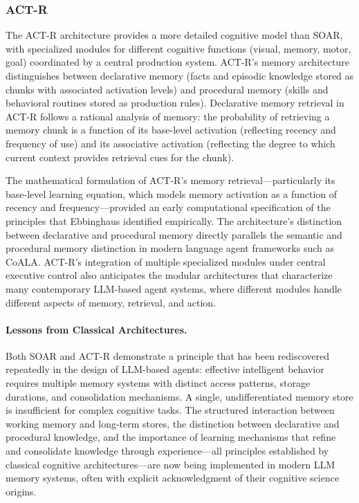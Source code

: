 \documentclass[11pt,letterpaper]{article}
\begin{document}
\subsubsection{ACT-R}

The ACT-R architecture \cite{anderson2004integrated} provides a more detailed cognitive model than SOAR, with specialized modules for different cognitive functions (visual, memory, motor, goal) coordinated by a central production system. ACT-R's memory architecture distinguishes between declarative memory (facts and episodic knowledge stored as chunks with associated activation levels) and procedural memory (skills and behavioral routines stored as production rules). Declarative memory retrieval in ACT-R follows a rational analysis of memory: the probability of retrieving a memory chunk is a function of its base-level activation (reflecting recency and frequency of use) and its associative activation (reflecting the degree to which current context provides retrieval cues for the chunk).

The mathematical formulation of ACT-R's memory retrieval---particularly its base-level learning equation, which models memory activation as a function of recency and frequency---provided an early computational specification of the principles that Ebbinghaus identified empirically. The architecture's distinction between declarative and procedural memory directly parallels the semantic and procedural memory distinction in modern language agent frameworks such as CoALA. ACT-R's integration of multiple specialized modules under central executive control also anticipates the modular architectures that characterize many contemporary LLM-based agent systems, where different modules handle different aspects of memory, retrieval, and action.

\paragraph{Lessons from Classical Architectures.} Both SOAR and ACT-R demonstrate a principle that has been rediscovered repeatedly in the design of LLM-based agents: effective intelligent behavior requires multiple memory systems with distinct access patterns, storage durations, and consolidation mechanisms. A single, undifferentiated memory store is insufficient for complex cognitive tasks. The structured interaction between working memory and long-term stores, the distinction between declarative and procedural knowledge, and the importance of learning mechanisms that refine and consolidate knowledge through experience---all principles established by classical cognitive architectures---are now being implemented in modern LLM memory systems, often with explicit acknowledgment of their cognitive science origins.
\end{document}
